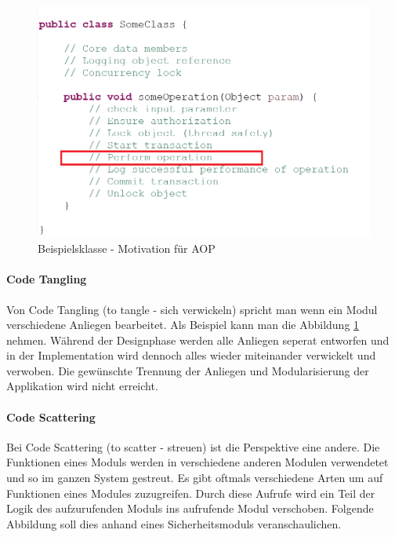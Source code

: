 \begin{figure}[H]
	\centering
		\includegraphics[scale=1.0]{bilder/motivationprogram}
	\caption{Beispielsklasse - Motivation für AOP}
	\label{fig:classmotivationaop}
\end{figure}



\paragraph{Code Tangling}

Von Code Tangling (to tangle - sich verwickeln) spricht man wenn ein Modul verschiedene Anliegen bearbeitet. Als Beispiel kann man die Abbildung \ref{fig:classmotivationaop} nehmen. Während der Designphase werden alle Anliegen seperat entworfen und in der Implementation wird dennoch alles wieder miteinander verwickelt und verwoben. Die gewünschte Trennung der Anliegen und Modularisierung der Applikation wird nicht erreicht.

\paragraph{Code Scattering}

Bei Code Scattering (to scatter - streuen) ist die Perspektive eine andere. Die Funktionen eines Moduls werden in verschiedene anderen Modulen verwendetet und so im ganzen System gestreut. Es gibt oftmals verschiedene Arten um auf Funktionen eines Modules zuzugreifen. Durch diese Aufrufe wird ein Teil der Logik des aufzurufenden Moduls ins aufrufende Modul verschoben. Folgende Abbildung soll dies anhand eines Sicherheitsmoduls veranschaulichen.

